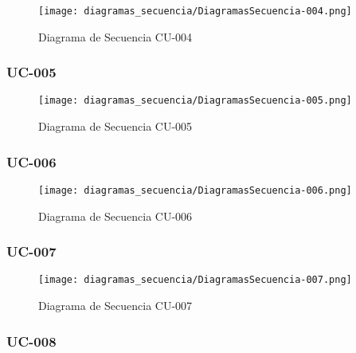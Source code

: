 \begin{figure}[H]
    \begin{center}
        \texttt{[image: diagramas\_secuencia/DiagramasSecuencia-004.png]}
    \end{center}
    \caption{Diagrama de Secuencia CU-004}
    \label{fig:DSCU-004}
\end{figure}

\subsubsection{UC-005 }

\begin{figure}[H]
    \begin{center}
        \texttt{[image: diagramas\_secuencia/DiagramasSecuencia-005.png]}
    \end{center}
    \caption{Diagrama de Secuencia CU-005}
    \label{fig:DSCU-005}
\end{figure}

\subsubsection{UC-006 }

\begin{figure}[H]
    \begin{center}
        \texttt{[image: diagramas\_secuencia/DiagramasSecuencia-006.png]}
    \end{center}
    \caption{Diagrama de Secuencia CU-006}
    \label{fig:DSCU-006}
\end{figure}
\newpage

\subsubsection{UC-007 }

\begin{figure}[H]
    \begin{center}
        \texttt{[image: diagramas\_secuencia/DiagramasSecuencia-007.png]}
    \end{center}
    \caption{Diagrama de Secuencia CU-007}
    \label{fig:DSCU-007}
\end{figure}

\newpage

\subsubsection{UC-008 }

